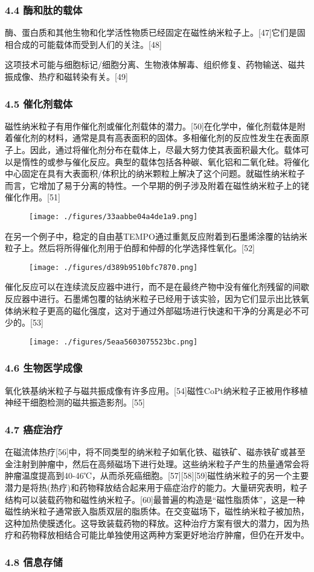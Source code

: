 \subsubsection{4.4 酶和肽的载体}
酶、蛋白质和其他生物和化学活性物质已经固定在磁性纳米粒子上。[47]它们是固相合成的可能载体而受到人们的关注。[48]

这项技术可能与细胞标记/细胞分离、生物液体解毒、组织修复、药物输送、磁共振成像、热疗和磁转染有关。[49]

\subsubsection{4.5 催化剂载体}
磁性纳米粒子有用作催化剂或催化剂载体的潜力。[50]在化学中，催化剂载体是附着催化剂的材料，通常是具有高表面积的固体。多相催化剂的反应性发生在表面原子上。因此，通过将催化剂分布在载体上，尽最大努力使其表面积最大化。载体可以是惰性的或参与催化反应。典型的载体包括各种碳、氧化铝和二氧化硅。将催化中心固定在具有大表面积/体积比的纳米颗粒上解决了这个问题。就磁性纳米粒子而言，它增加了易于分离的特性。一个早期的例子涉及附着在磁性纳米粒子上的铑催化作用。[51]
\begin{figure}[ht]
\centering
\texttt{[image: ./figures/33aabbe04a4de1a9.png]}
\caption\label{fig_CXNMLZ_5}
\end{figure}
在另一个例子中，稳定的自由基TEMPO通过重氮反应附着到石墨烯涂覆的钴纳米粒子上。然后将所得催化剂用于伯醇和仲醇的化学选择性氧化。[52]
\begin{figure}[ht]
\centering
\texttt{[image: ./figures/d389b9510bfc7870.png]}
\caption\label{fig_CXNMLZ_6}
\end{figure}
催化反应可以在连续流反应器中进行，而不是在最终产物中没有催化剂残留的间歇反应器中进行。石墨烯包覆的钴纳米粒子已经用于该实验，因为它们显示出比铁氧体纳米粒子更高的磁化强度，这对于通过外部磁场进行快速和干净的分离是必不可少的。[53]
\begin{figure}[ht]
\centering
\texttt{[image: ./figures/5eaa5603075523bc.png]}
\caption\label{fig_CXNMLZ_7}
\end{figure}

\subsubsection{4.6 生物医学成像}
氧化铁基纳米粒子与磁共振成像有许多应用。[54]磁性CoPt纳米粒子正被用作移植神经干细胞检测的磁共振造影剂。[55]

\subsubsection{4.7 癌症治疗}
在磁流体热疗[56]中，将不同类型的纳米粒子如氧化铁、磁铁矿、磁赤铁矿或甚至金注射到肿瘤中，然后在高频磁场下进行处理。这些纳米粒子产生的热量通常会将肿瘤温度提高到40-46℃，从而杀死癌细胞。[57][58][59]磁性纳米粒子的另一个主要潜力是将热(热疗)和药物释放结合起来用于癌症治疗的能力。大量研究表明，粒子结构可以装载药物和磁性纳米粒子。[60]最普遍的构造是“磁性脂质体”，这是一种磁性纳米粒子通常嵌入脂质双层的脂质体。在交变磁场下，磁性纳米粒子被加热，这种加热使膜透化。这导致装载药物的释放。这种治疗方案有很大的潜力，因为热疗和药物释放相结合可能比单独使用这两种方案更好地治疗肿瘤，但仍在开发中。

\subsubsection{4.8 信息存储}